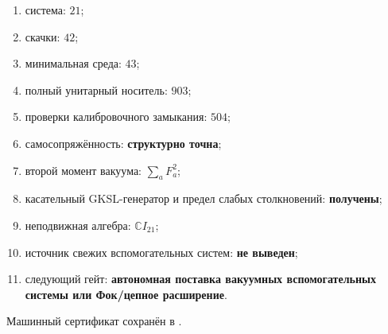 \begin{protocol}
\begin{enumerate}
 \item система: \textbf{$21$};
 \item скачки: \textbf{$42$};
 \item минимальная среда: \textbf{$43$};
 \item полный унитарный носитель: \textbf{$903$};
 \item проверки калибровочного замыкания: \textbf{$504$};
 \item самосопряжённость: \textbf{структурно точна};
 \item второй момент вакуума: \textbf{$\sum_aF_a^2$};
 \item касательный GKSL-генератор и предел слабых столкновений: \textbf{получены};
 \item неподвижная алгебра: \textbf{$\mathbb CI_{21}$};
 \item источник свежих вспомогательных систем: \textbf{не выведен};
 \item следующий гейт: \textbf{автономная поставка вакуумных вспомогательных системы или
       Фок/цепное расширение}.
\end{enumerate}
\end{protocol}

Машинный сертификат сохранён в
.